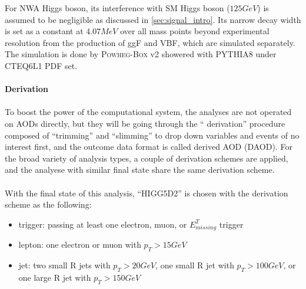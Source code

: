 \noindent
For NWA Higgs boson, its interference with SM Higgs boson ($125GeV$) is assumed to be negligible as discussed in \ref{sec:signal_intro}. Its narrow decay width is set as a constant at $4.07MeV$ over all mass points beyond experimental resolution from the production of ggF and VBF, which are simulated separately. The simulation is done by \textsc{Powheg-Box} v2 showered with \textsc{PYTHIA8} under \textsc{CTEQ6L1} PDF set. 
\\
\\{\bf Derivation}
\\
\\To boost the power of the computational system, the analyses are not operated on AODs directly, but they will be going through the `` derivation'' procedure composed of ``trimming'' and ``slimming'' to drop down variables and events of no interest first, and the outcome data format is called derived AOD (DAOD). For the broad variety of analysis types, a couple of derivation schemes are applied, and the analyese with similar final state share the same derivation scheme. 
\\
\\With the final state of this analysis, ``HIGG5D2'' is chosen with the derivation scheme as the following:
\begin{itemize}
  \item trigger: passing at least one electron, muon, or $E^{T}_{missing}$ trigger
  \item lepton: one electron or muon with $p_{T}>15GeV$ 
  \item jet: two small R jets with $p_{T}>20GeV$, one  small R jet with $p_{T}>100GeV$, or one large R jet with $p_{T}>150GeV$
\end{itemize}
